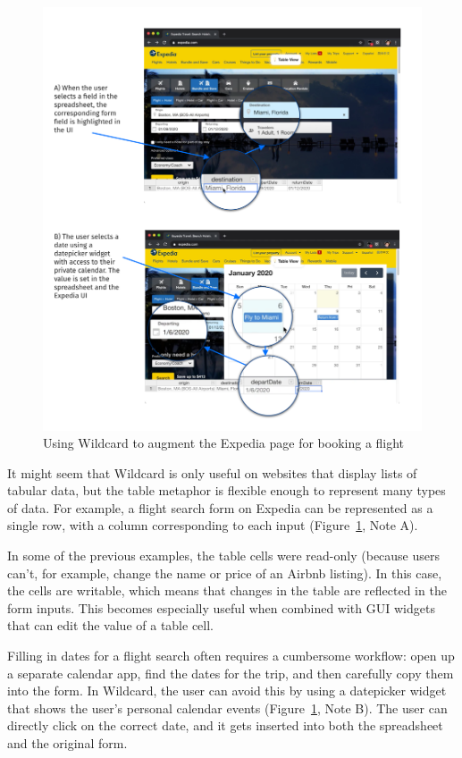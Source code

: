 \documentclass[english,submission]{programming}
\begin{document}
\begin{figure}
\hypertarget{fig:expedia-demo}{%
\centering
\includegraphics{media/expedia-demo-300dpi.png}
\caption{Using Wildcard to augment the Expedia page for booking a
flight}\label{fig:expedia-demo}
}
\end{figure}

It might seem that Wildcard is only useful on websites that display
lists of tabular data, but the table metaphor is flexible enough to
represent many types of data. For example, a flight search form on
Expedia can be represented as a single row, with a column corresponding
to each input{ (Figure~\ref{fig:expedia-demo}, Note A)}.

In some of the previous examples, the table cells were read-only
(because users can't, for example, change the name or price of an Airbnb
listing). In this case, the cells are writable, which means that changes
in the table are reflected in the form inputs. This becomes especially
useful when combined with GUI widgets that can edit the value of a table
cell.

Filling in dates for a flight search often requires a cumbersome
workflow: open up a separate calendar app, find the dates for the trip,
and then carefully copy them into the form. In Wildcard, the user can
avoid this by using a datepicker widget that shows the user's personal
calendar events{ (Figure~\ref{fig:expedia-demo}, Note B)}. The user can
directly click on the correct date, and it gets inserted into both the
spreadsheet and the original form.
\end{document}
